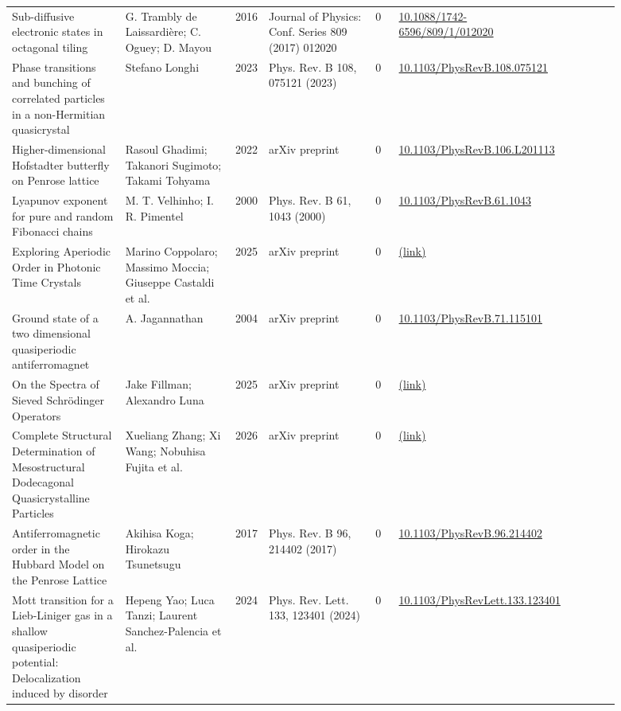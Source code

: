 \documentclass[10pt,a4paper]{article}
\begin{document}
{\begin{longtable}{p{0.192\linewidth}p{0.192\linewidth}p{0.043\linewidth}p{0.192\linewidth}p{0.043\linewidth}p{0.132\linewidth}p{0.096\linewidth}}
Sub-diffusive electronic states in octagonal tiling & G. Trambly de Laissardière; C. Oguey; D. Mayou & 2016 & Journal of Physics: Conf. Series 809 (2017) 012020 & 0 & \href{https://doi.org/10.1088/1742-6596/809/1/012020}{10.1088/1742-6596/809/1/012020} &  \\
Phase transitions and bunching of correlated particles in a non-Hermitian quasicrystal & Stefano Longhi & 2023 & Phys. Rev. B 108, 075121 (2023) & 0 & \href{https://doi.org/10.1103/PhysRevB.108.075121}{10.1103/PhysRevB.108.075121} &  \\
Higher-dimensional Hofstadter butterfly on Penrose lattice & Rasoul Ghadimi; Takanori Sugimoto; Takami Tohyama & 2022 & arXiv preprint & 0 & \href{https://doi.org/10.1103/PhysRevB.106.L201113}{10.1103/PhysRevB.106.L201113} &  \\
Lyapunov exponent for pure and random Fibonacci chains & M. T. Velhinho; I. R. Pimentel & 2000 & Phys. Rev. B 61, 1043 (2000) & 0 & \href{https://doi.org/10.1103/PhysRevB.61.1043}{10.1103/PhysRevB.61.1043} &  \\
Exploring Aperiodic Order in Photonic Time Crystals & Marino Coppolaro; Massimo Moccia; Giuseppe Castaldi et al. & 2025 & arXiv preprint & 0 & \href{http://arxiv.org/abs/2505.20039v1}{(link)} &  \\
Ground state of a two dimensional quasiperiodic antiferromagnet & A. Jagannathan & 2004 & arXiv preprint & 0 & \href{https://doi.org/10.1103/PhysRevB.71.115101}{10.1103/PhysRevB.71.115101} &  \\
On the Spectra of Sieved Schrödinger Operators & Jake Fillman; Alexandro Luna & 2025 & arXiv preprint & 0 & \href{http://arxiv.org/abs/2505.08763v1}{(link)} &  \\
Complete Structural Determination of Mesostructural Dodecagonal Quasicrystalline Particles & Xueliang Zhang; Xi Wang; Nobuhisa Fujita et al. & 2026 & arXiv preprint & 0 & \href{http://arxiv.org/abs/2608.02142v1}{(link)} &  \\
Antiferromagnetic order in the Hubbard Model on the Penrose Lattice & Akihisa Koga; Hirokazu Tsunetsugu & 2017 & Phys. Rev. B 96, 214402 (2017) & 0 & \href{https://doi.org/10.1103/PhysRevB.96.214402}{10.1103/PhysRevB.96.214402} &  \\
Mott transition for a Lieb-Liniger gas in a shallow quasiperiodic potential: Delocalization induced by disorder & Hepeng Yao; Luca Tanzi; Laurent Sanchez-Palencia et al. & 2024 & Phys. Rev. Lett. 133, 123401 (2024) & 0 & \href{https://doi.org/10.1103/PhysRevLett.133.123401}{10.1103/PhysRevLett.133.123401} &  \\

\end{longtable}}
\end{document}
